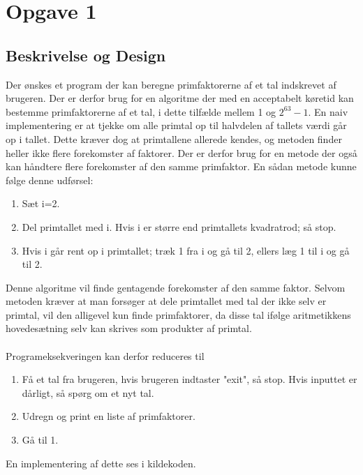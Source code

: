 \section{Opgave 1}
\subsection{Beskrivelse og Design}
Der ønskes et program der kan beregne primfaktorerne af et tal indskrevet af brugeren. Der er derfor brug for en algoritme der med en acceptabelt køretid kan bestemme primfaktorerne af et tal, i dette tilfælde mellem 1 og $2^{63}-1$.
En naiv implementering er at tjekke om alle primtal op til halvdelen af tallets værdi går op i tallet. Dette kræver dog at primtallene allerede kendes, og metoden finder heller ikke flere forekomster af faktorer. Der er derfor brug for en metode der også kan håndtere flere forekomster af den samme primfaktor. En sådan metode kunne følge denne udførsel: 
\begin{enumerate}
\item Sæt i=2.
\item Del primtallet med i. Hvis i er større end primtallets kvadratrod; så stop.
\item Hvis i går rent op i primtallet; træk 1 fra i og gå til 2, ellers læg 1 til i og gå til 2.
\end{enumerate}
Denne algoritme vil finde gentagende forekomster af den samme faktor. Selvom metoden kræver at man forsøger at dele primtallet med tal der ikke selv er primtal, vil den alligevel kun finde primfaktorer, da disse tal ifølge aritmetikkens hovedesætning selv kan skrives som produkter af primtal. \\
\\
Programeksekveringen kan derfor reduceres til
\begin{enumerate}
\item Få et tal fra brugeren, hvis brugeren indtaster "exit", så stop. Hvis inputtet er dårligt, så spørg om et nyt tal.
\item Udregn og print en liste af primfaktorer.
\item Gå til 1.
\end{enumerate}
En implementering af dette ses i kildekoden. \\
\\

